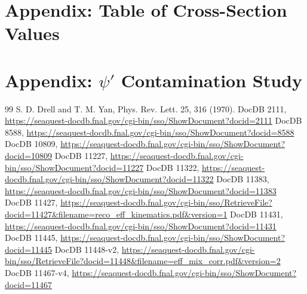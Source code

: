 \documentclass[11pt]{article}
\begin{document}

\clearpage



\clearpage

\section{Appendix: Table of Cross-Section Values}
\label{app:xsec_table}

\clearpage

\section{Appendix: \texorpdfstring{$\psi'$}{psi'} Contamination Study}
\label{app:psi_prime_study}

\newpage

\clearpage

\newpage

\clearpage

\newpage


\newpage

\clearpage

\begin{thebibliography}{99}
     S. D. Drell and T. M. Yan, Phys. Rev. Lett. 25, 316 (1970).
     DocDB 2111, \url{https://seaquest-docdb.fnal.gov/cgi-bin/sso/ShowDocument?docid=2111}
     DocDB 8588, \url{https://seaquest-docdb.fnal.gov/cgi-bin/sso/ShowDocument?docid=8588}
     DocDB 10809, \url{https://seaquest-docdb.fnal.gov/cgi-bin/sso/ShowDocument?docid=10809}
     DocDB 11227, \url{https://seaquest-docdb.fnal.gov/cgi-bin/sso/ShowDocument?docid=11227}
     DocDB 11322, \url{https://seaquest-docdb.fnal.gov/cgi-bin/sso/ShowDocument?docid=11322}
     DocDB 11383, \url{https://seaquest-docdb.fnal.gov/cgi-bin/sso/ShowDocument?docid=11383}
     DocDB 11427, \url{https://seaquest-docdb.fnal.gov/cgi-bin/sso/RetrieveFile?docid=11427&filename=reco_eff_kinematics.pdf&version=1}
     DocDB 11431, \url{https://seaquest-docdb.fnal.gov/cgi-bin/sso/ShowDocument?docid=11431}
     DocDB 11445, \url{https://seaquest-docdb.fnal.gov/cgi-bin/sso/ShowDocument?docid=11445}
     DocDB 11448-v2, \url{https://seaquest-docdb.fnal.gov/cgi-bin/sso/RetrieveFile?docid=11448&filename=eff_mix_corr.pdf&version=2}
     DocDB 11467-v4, \url{https://seaquest-docdb.fnal.gov/cgi-bin/sso/ShowDocument?docid=11467}
\end{thebibliography}
\end{document}
